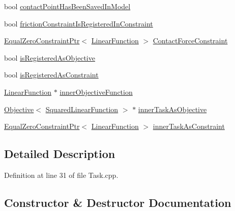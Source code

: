\begin{DoxyCompactItemize}
\item 
bool \hyperlink{structocra_1_1Task_1_1Pimpl_a609e0fedd60809c80e0381eafd97063a}{contact\+Point\+Has\+Been\+Saved\+In\+Model}
\item 
bool \hyperlink{structocra_1_1Task_1_1Pimpl_aa23ba3a568d9e47f1a6157715a818285}{friction\+Constraint\+Is\+Registered\+In\+Constraint}
\item 
\hyperlink{classocra_1_1EqualZeroConstraintPtr}{Equal\+Zero\+Constraint\+Ptr}$<$ \hyperlink{classocra_1_1LinearFunction}{Linear\+Function} $>$ \hyperlink{structocra_1_1Task_1_1Pimpl_afd9210ed3a558a170e75a7033e9ce4d8}{Contact\+Force\+Constraint}
\item 
bool \hyperlink{structocra_1_1Task_1_1Pimpl_a15289fedace1e80a0999cec502b60d23}{is\+Registered\+As\+Objective}
\item 
bool \hyperlink{structocra_1_1Task_1_1Pimpl_ae028c89ba97335288e09cf823399f680}{is\+Registered\+As\+Constraint}
\item 
\hyperlink{classocra_1_1LinearFunction}{Linear\+Function} $\ast$ \hyperlink{structocra_1_1Task_1_1Pimpl_a1af1ebecf090dacfa6f25164857b2437}{inner\+Objective\+Function}
\item 
\hyperlink{classocra_1_1Objective}{Objective}$<$ \hyperlink{classocra_1_1SquaredLinearFunction}{Squared\+Linear\+Function} $>$ $\ast$ \hyperlink{structocra_1_1Task_1_1Pimpl_a8b5dfe1995ff26df2c0505195da5c305}{inner\+Task\+As\+Objective}
\item 
\hyperlink{classocra_1_1EqualZeroConstraintPtr}{Equal\+Zero\+Constraint\+Ptr}$<$ \hyperlink{classocra_1_1LinearFunction}{Linear\+Function} $>$ \hyperlink{structocra_1_1Task_1_1Pimpl_ae4b95f72f96a2740186e49920e7672ad}{inner\+Task\+As\+Constraint}
\end{DoxyCompactItemize}


\subsection{Detailed Description}


Definition at line 31 of file Task.\+cpp.



\subsection{Constructor \& Destructor Documentation}
